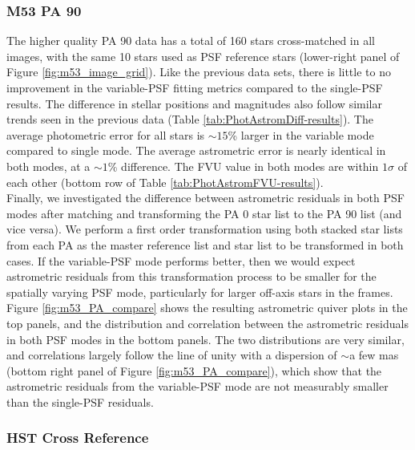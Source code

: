 \documentclass[]{spie}  %
\begin{document}
\subsubsection{M53 PA 90} \label{sec:result-m53-pa90}
The higher quality PA 90 data has a total of 160 stars cross-matched in all images, with the same 10 stars used as PSF reference stars (lower-right panel of Figure \ref{fig:m53_image_grid}). Like the previous data sets, there is little to no improvement in the variable-PSF fitting metrics compared to the single-PSF results. The difference in stellar positions and magnitudes also follow similar trends seen in the previous data (Table \ref{tab:PhotAstromDiff-results}). The average photometric error for all stars is ${\sim}15$\% larger in the variable mode compared to single mode. The average astrometric error is nearly identical in both modes, at a ${\sim}1$\% difference. The FVU value in both modes are within $1\sigma$ of each other (bottom row of Table \ref{tab:PhotAstromFVU-results}). \\
\indent Finally, we investigated the difference between astrometric residuals in both PSF modes after matching and transforming the PA 0 star list to the PA 90 list (and vice versa). We perform a first order transformation using both stacked star lists from each PA as the master reference list and star list to be transformed in both cases. If the variable-PSF mode performs better, then we would expect astrometric residuals from this transformation process to be smaller for the spatially varying PSF mode, particularly for larger off-axis stars in the frames. Figure \ref{fig:m53_PA_compare} shows the resulting astrometric quiver plots in the top panels, and the distribution and correlation between the astrometric residuals in both PSF modes in the bottom panels. The two distributions are very similar, and correlations largely follow the line of unity with a dispersion of ${\sim}$a few mas (bottom right panel of Figure \ref{fig:m53_PA_compare}), which show that the astrometric residuals from the variable-PSF mode are not measurably smaller than the single-PSF residuals.

\subsubsection{HST Cross Reference} \label{sec:m53-hst}
\end{document}
